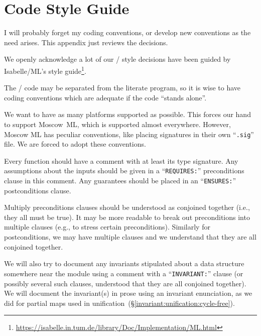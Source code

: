 
\section{Code Style Guide}

\begin{node}
I will probably forget my coding conventions, or develop new
conventions as the need arises. This appendix just reviews the
decisions.

We openly acknowledge a lot of our \SML/ style decisions have been
guided by Isabelle/ML's style guide\footnote{\url{https://isabelle.in.tum.de/library/Doc/Implementation/ML.html}}.
\end{node}

\begin{node}
The \SML/ code may be separated from the literate program, so it is
wise to have coding conventions which are adequate if the code
``stands alone''.
\end{node}

\begin{node}
We want to have as many platforms supported as possible. This forces
our hand to support Moscow~ML, which is supported almost
everywhere. However, Moscow ML has peculiar conventions, like placing
signatures in their own ``\texttt{.sig}'' file. We are forced to adopt
these conventions.
\end{node}

\begin{node}
Every function should have a comment with at least its type
signature. Any assumptions about the inputs should be given in a
``\texttt{REQUIRES:}'' preconditions clause in this comment. Any guarantees should
be placed in an ``\texttt{ENSURES:}'' postconditions clause.

Multiply preconditions clauses should be understood as conjoined
together (i.e., they all must be true). It may be more readable to
break out preconditions into multiple clauses (e.g., to stress certain
preconditions). Similarly for postconditions, we may have multiple
clauses and we understand that they are all conjoined together.
\end{node}

\begin{node}
We will also try to document any invariants stipulated about a data
structure somewhere near the module using a comment with a
``\texttt{INVARIANT:}'' clause (or possibly several such clauses,
understood that they are all conjoined together). We will document the
invariant(s) in prose using an invariant enunciation, as we did for
partial maps used in unification~(\S\ref{invariant:unification:cycle-free}).
\end{node}

